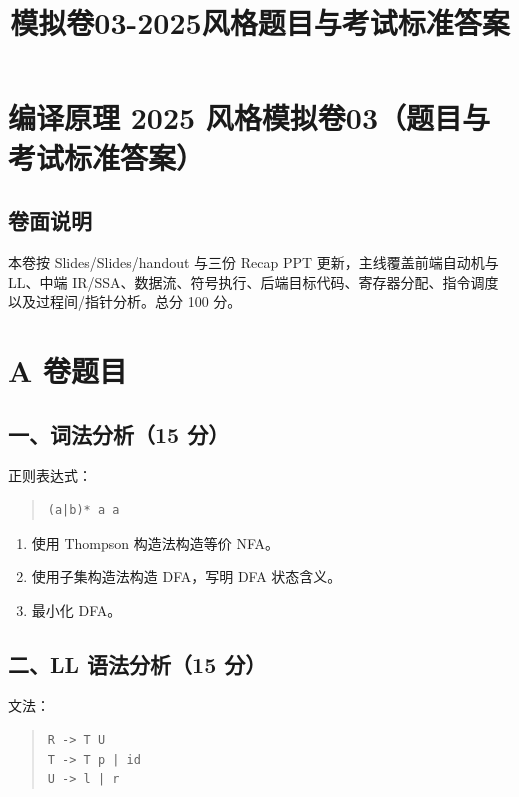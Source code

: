 \documentclass[UTF8,zihao=-4]{ctexart}
\title{模拟卷03-2025风格题目与考试标准答案}
\author{}
\date{}
\begin{document}
\maketitle
\setcounter{tocdepth}{1}
\tableofcontents
\newpage
\section{编译原理 2025 风格模拟卷03（题目与考试标准答案）}


\subsection{卷面说明}


本卷按 Slides/Slides/handout 与三份 Recap PPT 更新，主线覆盖前端自动机与 LL、中端 IR/SSA、数据流、符号执行、后端目标代码、寄存器分配、指令调度以及过程间/指针分析。总分 100 分。


\section{A 卷题目}


\subsection{一、词法分析（15 分）}


正则表达式：


\begin{quote}
\footnotesize
\begin{verbatim}
(a|b)* a a
\end{verbatim}
\end{quote}


\begin{enumerate}
\item 使用 Thompson 构造法构造等价 NFA。
\item 使用子集构造法构造 DFA，写明 DFA 状态含义。
\item 最小化 DFA。
\end{enumerate}


\subsection{二、LL 语法分析（15 分）}


文法：


\begin{quote}
\footnotesize
\begin{verbatim}
R -> T U
T -> T p | id
U -> l | r
\end{verbatim}
\end{quote}
\end{document}
